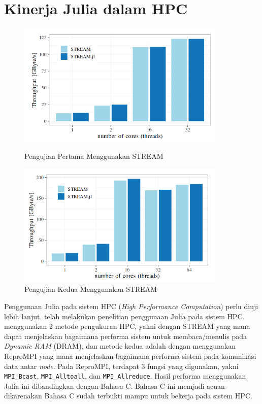 \section{Kinerja Julia dalam HPC}

\begin{figure}[H]
  \centering
  \includegraphics[width=10cm]{images/stream-1.png}
  \caption{Pengujian Pertama Menggunakan STREAM}
  \label{gambar stream-1}
  \includegraphics[width=10cm]{images/stream-2.png}
  \caption{Pengujian Kedua Menggunakan STREAM}
  \label{gambar stream-2}
\end{figure}

Penggunaan Julia pada sistem HPC (\emph{High Performance Computation}) perlu
diuji lebih lanjut. \cite{hunoldBenchmarkingJuliaCommunication2020} telah melakukan
penelitian penggunaan Julia pada sistem HPC.
\cite{hunoldBenchmarkingJuliaCommunication2020} menggunakan 2 metode pengukuran
HPC, yakni dengan STREAM yang mana dapat menjelaskan bagaimana performa sistem untuk
membaca/menulis pada \emph{Dynamic RAM} (DRAM), dan metode kedua adalah dengan menggunakan
ReproMPI yang mana menjelaskan bagaimana performa sistem pada komunikasi data antar
\emph{node}. Pada ReproMPI, terdapat 3 fungsi yang digunakan, yakni \texttt{MPI\_Bcast},
\texttt{MPI\_Alltoall}, dan \texttt{MPI\_Allreduce}. Hasil performa menggunakan Julia
ini dibandingkan dengan Bahasa C. Bahasa C ini memjadi acuan dikarenakan Bahasa
C sudah terbukti mampu untuk bekerja pada sistem HPC.

